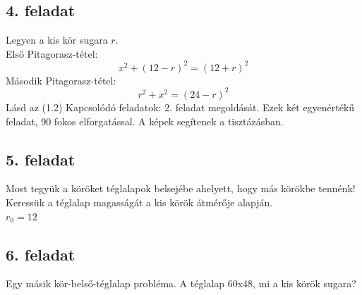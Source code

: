 \documentclass{article}
\begin{document}
\subsection{4. feladat}
Legyen a kis kör sugara $r$.\\
Első Pitagorasz-tétel:
\begin{equation}
    x^2 + (12 - r)^2 = (12 + r)^2
\end{equation}
Második Pitagorasz-tétel:
\begin{equation}
    r^2 + x^2 = (24-r)^2
\end{equation}
Lásd az (1.2) Kapcsolódó feladatok: 2. feladat megoldását. Ezek két egyenértékű feladat, 90 fokos elforgatással. A képek segítenek a tisztázásban.

\subsection{5. feladat}
Most tegyük a köröket téglalapok belsejébe ahelyett, hogy más körökbe tennénk!\\
Keressük a téglalap magasságát a kis körök átmérője alapján.\\
$r_0 = 12$

\subsection{6. feladat}
Egy másik kör-belső-téglalap probléma. A téglalap 60x48, mi a kis körök sugara?
\end{document}
